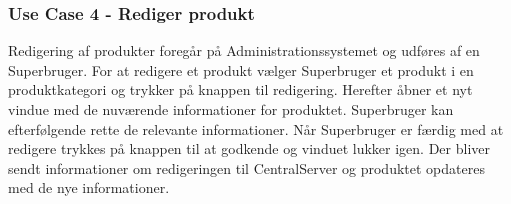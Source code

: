 \subsubsection{Use Case 4 - Rediger produkt}
Redigering af produkter foregår på Administrationssystemet og udføres af en Superbruger. For at redigere et produkt vælger Superbruger et produkt i en produktkategori og trykker på knappen til redigering. Herefter åbner et nyt vindue med de nuværende informationer for produktet. Superbruger kan efterfølgende rette de relevante informationer. Når Superbruger er færdig med at redigere trykkes på knappen til at godkende og vinduet lukker igen. Der bliver sendt informationer om redigeringen til CentralServer og produktet opdateres med de nye informationer.